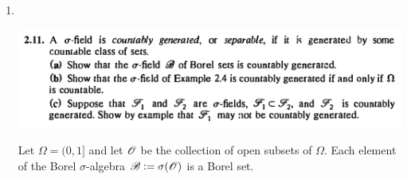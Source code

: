 \begin{enumerate}
\begin{enumerate}[label=(\alph*)]
\begin{proof}
      Let $B \in \ms B$. Then $B$ is formed from the elements of $\ms A$ by taking complements, finite unions
      and finite intersections. Therefore $B \in f(\ms A)$. Therefore $\ms B \subseteq f(\ms A)$.

      It remains to show that $\ms B$ is a algebra.

      Note that $\emptyset \in \ms B$, since with $m = n_1 = 1$ and $A_{11} = \emptyset$, we
      have $\emptyset = \bigcup_{i=1}^m\bigcap_{j=1}^{n_1}A_{ij}$.

      Next we show that $\ms B$ is closed under finite intersections.
      Let $B = \bigcup_{i=1}^m \bigcap_{j=1}^{n_i} A_{ij}$, where either $A_{ij} \in \ms A$
      or $A^c_{ij} \in \ms A$, and let $B' = \bigcup_{i=1}^{m'} \bigcap_{j=1}^{n'_i} A'_{ij}$, where
      either $A'_{ij} \in \ms A$ or $A^{'c}_{ij} \in \ms A$.

      We have
      \begin{align*}
        B \cap B'
        =& \big(\bigcup_{i=1}^m \bigcap_{j=1}^{n_i} A_{ij}\big)
           \bigcap
           \big(\bigcup_{i=1}^{m'} \bigcap_{j=1}^{n'_{i}} A'_{ij}\big)
      \end{align*}
      [ I think I should be able to simplify this from basic undergrad set theory and show that the result
      is of the desired form.]

      It follows from induction that $\ms B$ is closed under finite intersections.

      Finally we show that $\ms B$ is closed under complements. As before,
      let $B = \bigcup_{i=1}^m \bigcap_{j=1}^{n_i} A_{ij}$, where either $A_{ij} \in \ms A$
      or $A^c_{ij} \in \ms A$. Then
      \begin{align*}
        B^c
        &= \Big(\bigcup_{i=1}^m \bigcap_{j=1}^{n_i} A_{ij}\Big)^c \\
        &= \bigcap_{i=1}^m \bigcup_{j=1}^{n_i} A^c_{ij}.
      \end{align*}

       Why is this of the required form?
    \end{proof}

  \end{enumerate}
  \newpage
\item~\\
  \begin{mdframed}
    \includegraphics[width=400pt]{img/analysis--berkeley-202a-hw-fc85.png}
  \end{mdframed}
  \begin{definition*}
    Let $\Omega = (0, 1]$ and let $\mathscr O$ be the collection of open subsets of $\Omega$. Each element of the
    Borel $\sigma$-algebra $\mathscr B := \sigma(\mathscr O)$ is a Borel set.
  \end{definition*}


\end{enumerate}
